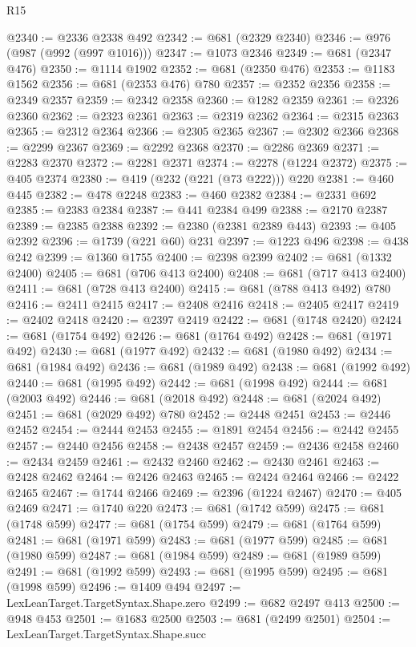 \begin{lexlean}{R15}
\begin{coremodule}
@2340 := @2336 @2338 @492
@2342 := @681 (@2329 @2340)
@2346 := @976 (@987 (@992 (@997 @1016)))
@2347 := @1073 @2346
@2349 := @681 (@2347 @476)
@2350 := @1114 @1902
@2352 := @681 (@2350 @476)
@2353 := @1183 @1562
@2356 := @681 (@2353 @476) @780
@2357 := @2352 @2356
@2358 := @2349 @2357
@2359 := @2342 @2358
@2360 := @1282 @2359
@2361 := @2326 @2360
@2362 := @2323 @2361
@2363 := @2319 @2362
@2364 := @2315 @2363
@2365 := @2312 @2364
@2366 := @2305 @2365
@2367 := @2302 @2366
@2368 := @2299 @2367
@2369 := @2292 @2368
@2370 := @2286 @2369
@2371 := @2283 @2370
@2372 := @2281 @2371
@2374 := @2278 (@1224 @2372)
@2375 := @405 @2374
@2380 := @419 (@232 (@221 (@73 @222))) @220
@2381 := @460 @445
@2382 := @478 @2248
@2383 := @460 @2382
@2384 := @2331 @692
@2385 := @2383 @2384
@2387 := @441 @2384 @499
@2388 := @2170 @2387
@2389 := @2385 @2388
@2392 := @2380 (@2381 @2389 @443)
@2393 := @405 @2392
@2396 := @1739 (@221 @60) @231
@2397 := @1223 @496
@2398 := @438 @242
@2399 := @1360 @1755
@2400 := @2398 @2399
@2402 := @681 (@1332 @2400)
@2405 := @681 (@706 @413 @2400)
@2408 := @681 (@717 @413 @2400)
@2411 := @681 (@728 @413 @2400)
@2415 := @681 (@788 @413 @492) @780
@2416 := @2411 @2415
@2417 := @2408 @2416
@2418 := @2405 @2417
@2419 := @2402 @2418
@2420 := @2397 @2419
@2422 := @681 (@1748 @2420)
@2424 := @681 (@1754 @492)
@2426 := @681 (@1764 @492)
@2428 := @681 (@1971 @492)
@2430 := @681 (@1977 @492)
@2432 := @681 (@1980 @492)
@2434 := @681 (@1984 @492)
@2436 := @681 (@1989 @492)
@2438 := @681 (@1992 @492)
@2440 := @681 (@1995 @492)
@2442 := @681 (@1998 @492)
@2444 := @681 (@2003 @492)
@2446 := @681 (@2018 @492)
@2448 := @681 (@2024 @492)
@2451 := @681 (@2029 @492) @780
@2452 := @2448 @2451
@2453 := @2446 @2452
@2454 := @2444 @2453
@2455 := @1891 @2454
@2456 := @2442 @2455
@2457 := @2440 @2456
@2458 := @2438 @2457
@2459 := @2436 @2458
@2460 := @2434 @2459
@2461 := @2432 @2460
@2462 := @2430 @2461
@2463 := @2428 @2462
@2464 := @2426 @2463
@2465 := @2424 @2464
@2466 := @2422 @2465
@2467 := @1744 @2466
@2469 := @2396 (@1224 @2467)
@2470 := @405 @2469
@2471 := @1740 @220
@2473 := @681 (@1742 @599)
@2475 := @681 (@1748 @599)
@2477 := @681 (@1754 @599)
@2479 := @681 (@1764 @599)
@2481 := @681 (@1971 @599)
@2483 := @681 (@1977 @599)
@2485 := @681 (@1980 @599)
@2487 := @681 (@1984 @599)
@2489 := @681 (@1989 @599)
@2491 := @681 (@1992 @599)
@2493 := @681 (@1995 @599)
@2495 := @681 (@1998 @599)
@2496 := @1409 @494
@2497 := LexLeanTarget.TargetSyntax.Shape.zero
@2499 := @682 @2497 @413
@2500 := @948 @453
@2501 := @1683 @2500
@2503 := @681 (@2499 @2501)
@2504 := LexLeanTarget.TargetSyntax.Shape.succ

\end{coremodule}
\end{lexlean}
